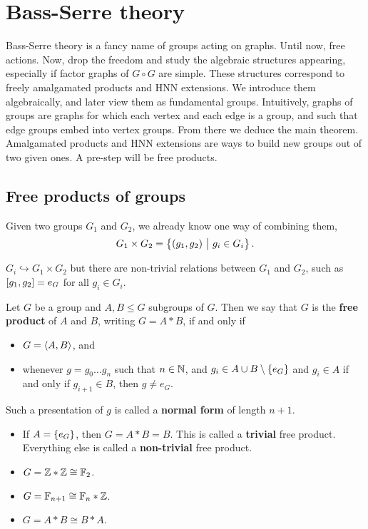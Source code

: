 \pagebreak

\section{Bass-Serre theory}

Bass-Serre theory is a fancy name of groups acting on graphs. Until now, free actions. Now, drop the freedom and study the algebraic structures appearing, especially if factor graphs of $ G \circ G $ are simple. These structures correspond to freely amalgamated products and HNN extensions. We introduce them algebraically, and later view them as fundamental groups. Intuitively, graphs of groups are graphs for which each vertex and each edge is a group, and such that edge groups embed into vertex groups. From there we deduce the main theorem. Amalgamated products and HNN extensions are ways to build new groups out of two given ones. A pre-step will be free products.

\subsection{Free products of groups}

Given two groups $ G_1 $ and $ G_2 $, we already know one way of combining them,
$$ G_1 \times G_2 = \cbr{\br{g_1, g_2} \st g_i \in G_i}. $$

\begin{note*}
$ G_i \hookrightarrow G_1 \times G_2 $ but there are non-trivial relations between $ G_1 $ and $ G_2 $, such as $ \sbr{g_1, g_2} = e_G $ for all $ g_i \in G_i $.
\end{note*}

\begin{definition}
Let $ G $ be a group and $ A, B \le G $ subgroups of $ G $. Then we say that $ G $ is the \textbf{free product} of $ A $ and $ B $, writing $ G = A * B $, if and only if
\begin{itemize}
\item $ G = \left\langle A, B \right\rangle $, and
\item whenever $ g = g_0 \dots g_n $ such that $ n \in \mathbb{N} $, and $ g_i \in A \cup B \setminus \cbr{e_G} $ and $ g_i \in A $ if and only if $ g_{i + 1} \in B $, then $ g \ne e_G $.
\end{itemize}
Such a presentation of $ g $ is called a \textbf{normal form} of length $ n + 1 $.
\end{definition}

\begin{remark}
\hfill
\begin{itemize}
\item If $ A = \cbr{e_G} $, then $ G = A * B = B $. This is called a \textbf{trivial} free product. Everything else is called a \textbf{non-trivial} free product.
\item $ G = \mathbb{Z} * \mathbb{Z} \cong \mathbb{F}_2 $.
\item $ G = \mathbb{F}_{n + 1} \cong \mathbb{F}_n * \mathbb{Z} $.
\item $ G = A * B \cong B * A $.
\end{itemize}
\end{remark}

